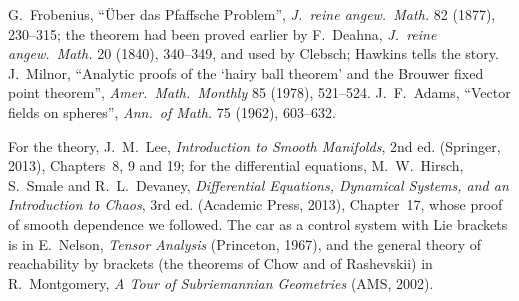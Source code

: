 G.~Frobenius, ``\"Uber das Pfaffsche Problem'', \emph{J.\ reine angew.\ Math.} 82 (1877), 230--315; the theorem had been proved earlier by F.~Deahna,
\emph{J.\ reine angew.\ Math.} 20 (1840), 340--349, and used by Clebsch; Hawkins tells the story. J.~Milnor, ``Analytic proofs of the `hairy ball theorem'
and the Brouwer fixed point theorem'', \emph{Amer.\ Math.\ Monthly} 85 (1978), 521--524. J.~F.~Adams, ``Vector fields on spheres'', \emph{Ann.\ of Math.}
75 (1962), 603--632.

For the theory, J.~M.~Lee, \emph{Introduction to Smooth Manifolds}, 2nd ed. (Springer, 2013), Chapters~8, 9 and 19; for the differential equations,
M.~W.~Hirsch, S.~Smale and R.~L.~Devaney, \emph{Differential Equations, Dynamical Systems, and an Introduction to Chaos}, 3rd ed. (Academic Press, 2013),
Chapter~17, whose proof of smooth dependence we followed. The car as a control system with Lie brackets is in E.~Nelson, \emph{Tensor Analysis}
(Princeton, 1967), and the general theory of reachability by brackets (the theorems of Chow and of Rashevskii) in R.~Montgomery, \emph{A Tour of
Subriemannian Geometries} (AMS, 2002).
